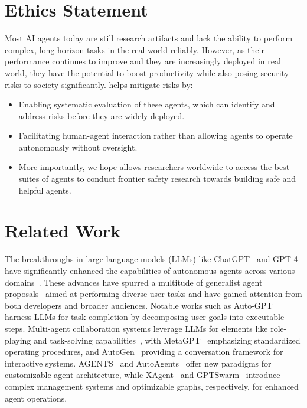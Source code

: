 \section{Ethics Statement}
\label{sec:ethics}
Most AI agents today are still research artifacts and lack the ability to perform complex, long-horizon tasks in the real world reliably. However, as their performance continues to improve and they are increasingly deployed in real world, they have the potential to boost productivity while also posing security risks to society significantly.
\projname helps mitigate risks by: 
\begin{itemize}[noitemsep,topsep=0pt,parsep=2pt,partopsep=0pt,leftmargin=18pt]
\item[(1)] Enabling systematic evaluation of these agents, which can identify and address risks before they are widely deployed.
\item[(2)] Facilitating human-agent interaction rather than allowing agents to operate autonomously without oversight.
\item[(3)] More importantly, we hope \projname allows researchers worldwide to access the best suites of agents to conduct frontier safety research towards building safe and helpful agents.
\end{itemize}



\section{Related Work}
\label{sec:related_work}

The breakthroughs in large language models (LLMs) like ChatGPT~\cite{openai2024chatgpt} and GPT-4~\cite{openai2024gpt4} have significantly enhanced the capabilities of autonomous agents across various domains~\cite{ye2023proagent,tang2024medagents,park2023generative,cui2023chatlaw}. These advances have spurred a multitude of generalist agent proposals~\cite{gravitasauto,nakajima2023task,wu2023autogen} aimed at performing diverse user tasks and have gained attention from both developers and broader audiences. Notable works such as Auto-GPT~\cite{gravitasauto} harness LLMs for task completion by decomposing user goals into executable steps. Multi-agent collaboration systems leverage LLMs for elements like role-playing and task-solving capabilities~\cite{zhuge2023mindstorms,li2023camel,zhou2023agents,xagent2023}, with MetaGPT~\cite{hong2023metagpt} emphasizing standardized operating procedures, and AutoGen~\cite{wu2023autogen} providing a conversation framework for interactive systems. AGENTS~\cite{zhou2023agents} and AutoAgents~\cite{chen2024autoagents} offer new paradigms for customizable agent architecture, while XAgent~\cite{xagent2023} and GPTSwarm~\cite{zhuge2024language} introduce complex management systems and optimizable graphs, respectively, for enhanced agent operations.

